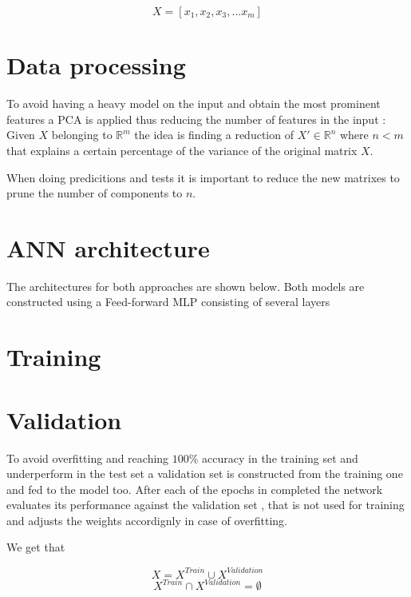 $$X = [x_1, x_2, x_3, ... x_m]$$


\section{Data processing}

To avoid having a heavy model on the input and obtain the most prominent features a PCA is applied thus reducing the number of features in the input \cite{pca} \cite{Minka2001}: 
Given $X$ belonging to $\mathbb{R}^m$ the idea is finding a reduction of $ X' \in \mathbb{R}^n$ where $n < m$ that explains a certain percentage of the variance of the original matrix $X$.

When doing predicitions and tests it is important to reduce the new matrixes to prune the number of components to $n$. 


\section{ANN architecture}
The architectures for both approaches are shown below. 
Both models are constructed using a Feed-forward MLP consisting of several layers

\section{Training}


\section{Validation}
To avoid overfitting and reaching $100\%$ accuracy in the training set and underperform in the test set a validation set is constructed from the training one and fed to the model too.
After each of the epochs in completed the network evaluates its performance against the validation set , that is not used for training and adjusts the weights accordignly in case of overfitting.

We get that

$$X = X^{Train} \cup X^{Validation}$$
$$X^{Train} \cap X^{Validation} =  \emptyset $$

